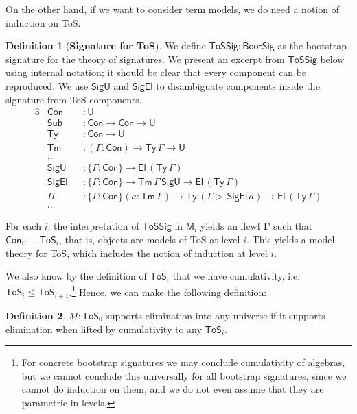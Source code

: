 \documentclass[12pt,a4paper,twoside,openany]{book}
\theoremstyle{remark}
\theoremstyle{definition}
\newtheorem{mydefinition}{Definition}
\theoremstyle{theorem}
\newcommand{\ms}[1]{\mathsf{#1}}
\newcommand{\bs}[1]{\boldsymbol{#1}}
\newcommand{\Con}{\mathsf{Con}}
\newcommand{\Sub}{\mathsf{Sub}}
\newcommand{\Tm}{\mathsf{Tm}}
\newcommand{\Ty}{\mathsf{Ty}}
\newcommand{\U}{\mathsf{U}}
\newcommand{\El}{\mathsf{El}}
\newcommand{\ToS}{\mathsf{ToS}}
\newcommand{\ext}{\triangleright}
\newcommand{\ToSSig}{\mathsf{ToSSig}}
\newcommand{\bGamma}{\bs{\Gamma}}
\newcommand{\bM}{\bs{\mathsf{M}}}
\begin{document}
On the other hand, if we want to consider term models, we do need a notion of
induction on ToS.

\begin{mydefinition}[\textbf{Signature for ToS}]
We define $\ToSSig : \ms{BootSig}$ as the bootstrap signature for the theory of
signatures. We present an excerpt from $\ToSSig$ below using internal notation;
it should be clear that every component can be reproduced. We use $\ms{SigU}$
and $\ms{SigEl}$ to disambiguate components inside the signature from ToS
components.
\begingroup
\allowdisplaybreaks
\begin{alignat*}{3}
  & \Con       &&: \U\\
  & \Sub       &&: \Con \to \Con \to \U\\
  & \Ty        &&: \Con \to \U\\
  & \Tm        &&: (\Gamma : \Con) \to \Ty\,\Gamma \to \U\\
  & ...        &&\\
  & \ms{SigU}  &&: \{\Gamma : \Con\} \to \El\,(\Ty\,\Gamma)\\
  & \ms{SigEl} &&: \{\Gamma : \Con\} \to \Tm\,\Gamma\,\ms{SigU} \to \El\,(\Ty\,\Gamma)\\
  & \Pi        &&: \{\Gamma : \Con\}(a : \Tm\,\Gamma) \to \Ty\,(\Gamma\ext\,\ms{SigEl}\,a)
                   \to \El\,(\Ty\,\Gamma)\\
  & ...        &&
\end{alignat*}
\end{mydefinition}
\endgroup
For each $i$, the interpretation of $\ToSSig$ in $\bM_{i}$ yields an flcwf
$\bGamma$ such that $\Con_{\bGamma} \equiv \ToS_{i}$, that is, objects are
models of ToS at level $i$. This yields a model theory for ToS, which includes
the notion of induction at level $i$.

We also know by the definition of $\ToS_{i}$ that we have cumulativity,
i.e.\ $\ToS_{i} \leq \ToS_{i+1}$.\footnote{For concrete bootstrap signatures we
may conclude cumulativity of algebras, but we cannot conclude this universally
for all bootstrap signatures, since we cannot do induction on them, and we do not
even assume that they are parametric in levels.} Hence, we can make the
following definition:

\begin{mydefinition} $M : \ToS_0$ supports elimination into any universe if
it supports elimination when lifted by cumulativity to any $\ToS_i$.
\end{mydefinition}
\end{document}
